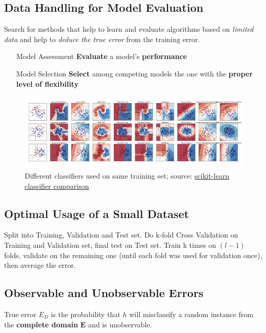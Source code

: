 \documentclass[11pt]{article}
\theoremstyle{definition}
\begin{document}
\subsection{Data Handling for Model Evaluation}
Search for methods that help to learn and evaluate algorithms based on \emph{limited data} and help to \emph{deduce the true error} from the training error.

\begin{itemize}[leftmargin=*, labelindent=3cm, labelsep=1cm]
	\item[Model Assessment] \textbf{Evaluate} a model's \textbf{performance}
	\item[Model Selection] \textbf{Select} among competing models the one with the \textbf{proper level of flexibility}
\end{itemize}

\begin{figure}[H]
	\centering
	\includegraphics[width=0.9\linewidth]{img/model_flexibility}
	\caption{Different classifiers used on same training set; source: \href{https://scikit-learn.org/stable/auto_examples/classification/plot_classifier_comparison.html}{scikit-learn classifier comparison}}
\end{figure}

\subsection{Optimal Usage of a Small Dataset}
Split into Training, Validation and Test set. Do k-fold Cross Validation on Training and Validation set, final test on Test set. Train k times on $(l - 1)$ folds, validate on the remaining one (until each fold was used for validation once), then average the error.

\subsection{Observable and Unobservable Errors}
True error $E_D$ is the probability that $h$ will misclassify a random instance from the \textbf{complete domain} $\bm{E}$ and is unobservable.
\end{document}
